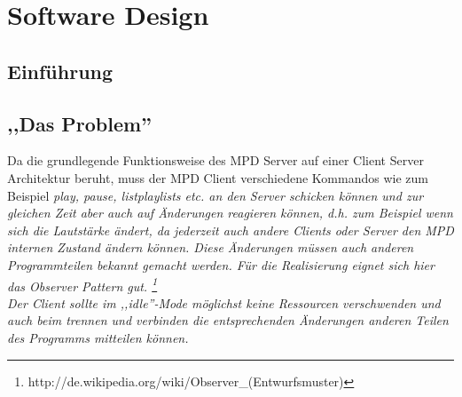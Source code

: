 
\chapter{Software Design}

\section{Einführung}

\section{,,Das Problem''}

Da die grundlegende Funktionsweise des MPD Server auf einer Client Server Architektur beruht, muss der MPD Client
verschiedene Kommandos wie zum Beispiel \it play, pause, listplaylists \rm etc. an den Server schicken können
und zur gleichen Zeit aber auch auf Änderungen reagieren können, d.h. zum Beispiel wenn sich die Lautstärke ändert,
da jederzeit auch andere Clients oder Server den MPD internen Zustand ändern können.
Diese Änderungen müssen auch anderen Programmteilen bekannt gemacht werden.
Für die Realisierung eignet sich hier das Observer Pattern gut. \footnote{http://de.wikipedia.org/wiki/Observer\_(Entwurfsmuster)}
\\
Der Client sollte im ,,idle''-Mode möglichst keine Ressourcen verschwenden und auch beim 
trennen und verbinden die entsprechenden Änderungen anderen Teilen des Programms mitteilen
können. 
\\


